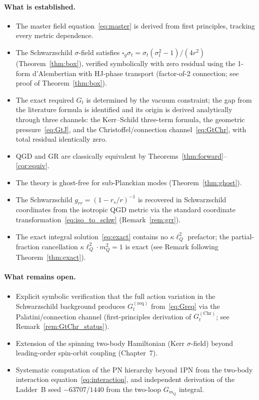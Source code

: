 \documentclass[11pt,a4paper]{article}
\theoremstyle{plain}
\theoremstyle{definition}
\theoremstyle{remark}
\newcommand{\sigt}{\sigma_t}
\newcommand{\rs}{r_s}
\newcommand{\lQ}{\ell_Q}
\newcommand{\mQ}{m_Q}
\newcommand{\boxg}{\square_g}
\begin{document}
\paragraph{What is established.}
\begin{itemize}[nosep]
  \item The master field equation~\eqref{eq:master} is derived from first principles,
    tracking every metric dependence.
  \item The Schwarzschild $\sigma$-field satisfies $\boxg\sigt = \sigt(\sigt^2-1)/(4r^2)$
    (Theorem~\ref{thm:box}), verified symbolically with zero residual using the
    1-form d'Alembertian with HJ-phase transport (factor-of-2 connection;
    see proof of Theorem~\ref{thm:box}).
  \item The exact required $G_t$ is determined by the vacuum constraint; the gap
    from the literature formula is identified and its origin is derived analytically
    through three channels: the Kerr--Schild three-term formula, the geometric
    pressure~\eqref{eq:GtJ}, and the Christoffel/connection channel~\eqref{eq:GtChr},
    with total residual identically zero.
  \item QGD and GR are classically equivalent by Theorems~\ref{thm:forward}--\ref{cor:equiv}.
  \item The theory is ghost-free for sub-Planckian modes (Theorem~\ref{thm:ghost}).
  \item The Schwarzschild $g_{rr} = (1-\rs/r)^{-1}$ is recovered in Schwarzschild
    coordinates from the isotropic QGD metric via the standard coordinate
    transformation~\eqref{eq:iso_to_schw} (Remark~\ref{rem:grr}).
  \item The exact integral solution~\eqref{eq:exact} contains no $\kappa\lQ^2$
    prefactor; the partial-fraction cancellation $\kappa\lQ^2\cdot\mQ^2=1$ is
    exact (see Remark following Theorem~\ref{thm:exact}).
\end{itemize}

\paragraph{What remains open.}
\begin{itemize}[nosep]
  \item Explicit symbolic verification that the full action variation in the
    Schwarzschild background produces $G_t^{(\mathrm{req})}$ from~\eqref{eq:Greq}
    via the Palatini/connection channel (first-principles derivation of
    $G_t^{(\mathrm{Chr})}$; see Remark~\ref{rem:GtChr_status}).
  \item Extension of the spinning two-body Hamiltonian (Kerr $\sigma$-field) beyond
    leading-order spin-orbit coupling (Chapter~7).
  \item Systematic computation of the PN hierarchy beyond 1PN from the two-body
    interaction equation~\eqref{eq:interaction}, and independent derivation
    of the Ladder~B seed $-63707/1440$ from the two-loop $G_{m_Q}$ integral.
\end{itemize}
\end{document}
